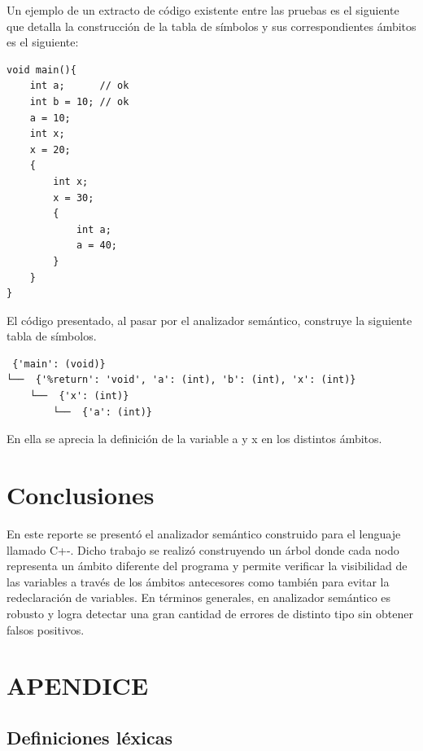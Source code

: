 \documentclass[12pt]{article}
\begin{document}
Un ejemplo de un extracto de c\'odigo existente entre las pruebas es el siguiente que detalla la construcci\'on de la tabla de s\'imbolos y sus correspondientes \'ambitos es el siguiente:
\begin{verbatim}
void main(){
    int a;      // ok
    int b = 10; // ok
    a = 10;
    int x;
    x = 20;
    {
        int x;
        x = 30;
        {
            int a;
            a = 40;
        }
    }
}
\end{verbatim}

El c\'odigo presentado, al pasar por el analizador sem\'antico, construye la siguiente tabla de s\'imbolos.
\begin{verbatim}
 {'main': (void)}
└──  {'%return': 'void', 'a': (int), 'b': (int), 'x': (int)}
    └──  {'x': (int)}
        └──  {'a': (int)}
\end{verbatim}
En ella se aprecia la definición de la variable a y x en los distintos ámbitos.


\section*{Conclusiones}
En este reporte se present\'o el analizador sem\'antico construido para el lenguaje llamado C+-. Dicho trabajo se realiz\'o construyendo un \'arbol donde cada nodo representa un \'ambito diferente del programa y permite verificar la visibilidad de las variables a trav\'es de los \'ambitos antecesores como tambi\'en para evitar la redeclaraci\'on de variables.
En t\'erminos generales, en analizador sem\'antico es robusto y logra detectar una gran cantidad de errores de distinto tipo sin obtener falsos positivos.



\clearpage
\section*{APENDICE}

\subsection*{Definiciones l\'exicas}
\end{document}

